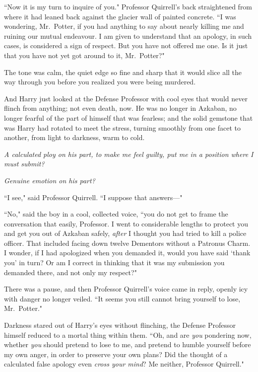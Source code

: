 ``Now it is my turn to inquire of you." Professor Quirrell's back straightened from where it had leaned back against the glacier wall of painted concrete. ``I was wondering, Mr.~Potter, if you had anything to say about nearly killing me and ruining our mutual endeavour. I am given to understand that an apology, in such cases, is considered a sign of respect. But you have not offered me one. Is it just that you have not yet got around to it, Mr.~Potter?"

The tone was calm, the quiet edge so fine and sharp that it would slice all the way through you before you realized you were being murdered.

And Harry just looked at the Defense Professor with cool eyes that would never flinch from anything; not even death, now. He was no longer in Azkaban, no longer fearful of the part of himself that was fearless; and the solid gemstone that was Harry had rotated to meet the stress, turning smoothly from one facet to another, from light to darkness, warm to cold.

\emph{A calculated ploy on his part, to make me feel guilty, put me in a position where I must submit?}

\emph{Genuine emotion on his part?}

``I see," said Professor Quirrell. ``I suppose that answers—"

``No," said the boy in a cool, collected voice, ``you do not get to frame the conversation that easily, Professor. I went to considerable lengths to protect you and get you out of Azkaban safely, \emph{after} I thought you had tried to kill a police officer. That included facing down twelve Dementors without a Patronus Charm. I wonder, if I had apologized when you demanded it, would you have said `thank you' in turn? Or am I correct in thinking that it was my submission you demanded there, and not only my respect?"

There was a pause, and then Professor Quirrell's voice came in reply, openly icy with danger no longer veiled. ``It seems you still cannot bring yourself to lose, Mr.~Potter."

Darkness stared out of Harry's eyes without flinching, the Defense Professor himself reduced to a mortal thing within them. ``Oh, and are \emph{you} pondering now, whether \emph{you} should pretend to lose to me, and pretend to humble yourself before my own anger, in order to preserve your own plans? Did the thought of a calculated false apology even \emph{cross your mind}? Me neither, Professor Quirrell."

